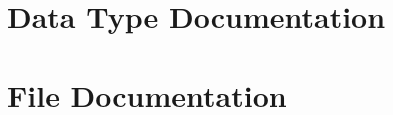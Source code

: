 \documentclass[twoside]{book}
\begin{document}
\chapter{Data Type Documentation}


\chapter{File Documentation}
















\newpage
{}
{}



\newpage
{}
{}
\printindex
\end{document}
